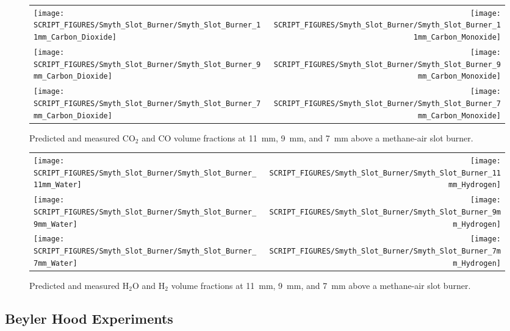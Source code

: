 \begin{figure}[p]
\begin{tabular*}{\textwidth}{l@{\extracolsep{\fill}}r}
\texttt{[image: SCRIPT\_FIGURES/Smyth\_Slot\_Burner/Smyth\_Slot\_Burner\_11mm\_Carbon\_Dioxide]} &
\texttt{[image: SCRIPT\_FIGURES/Smyth\_Slot\_Burner/Smyth\_Slot\_Burner\_11mm\_Carbon\_Monoxide]} \\
\texttt{[image: SCRIPT\_FIGURES/Smyth\_Slot\_Burner/Smyth\_Slot\_Burner\_9mm\_Carbon\_Dioxide]} &
\texttt{[image: SCRIPT\_FIGURES/Smyth\_Slot\_Burner/Smyth\_Slot\_Burner\_9mm\_Carbon\_Monoxide]} \\
\texttt{[image: SCRIPT\_FIGURES/Smyth\_Slot\_Burner/Smyth\_Slot\_Burner\_7mm\_Carbon\_Dioxide]} &
\texttt{[image: SCRIPT\_FIGURES/Smyth\_Slot\_Burner/Smyth\_Slot\_Burner\_7mm\_Carbon\_Monoxide]}
\end{tabular*}
\caption[CO$_2$ and CO volume fractions at 11~mm, 9~mm, and 7~mm above burner, Smyth burner]
{Predicted and measured CO$_2$ and CO volume fractions at 11~mm, 9~mm, and 7~mm above a methane-air slot burner.}
\label{Smyth_Slot_Burner_co_co2}
\end{figure}

\begin{figure}[p]
\begin{tabular*}{\textwidth}{l@{\extracolsep{\fill}}r}
\texttt{[image: SCRIPT\_FIGURES/Smyth\_Slot\_Burner/Smyth\_Slot\_Burner\_11mm\_Water]} &
\texttt{[image: SCRIPT\_FIGURES/Smyth\_Slot\_Burner/Smyth\_Slot\_Burner\_11mm\_Hydrogen]} \\
\texttt{[image: SCRIPT\_FIGURES/Smyth\_Slot\_Burner/Smyth\_Slot\_Burner\_9mm\_Water]} &
\texttt{[image: SCRIPT\_FIGURES/Smyth\_Slot\_Burner/Smyth\_Slot\_Burner\_9mm\_Hydrogen]} \\
\texttt{[image: SCRIPT\_FIGURES/Smyth\_Slot\_Burner/Smyth\_Slot\_Burner\_7mm\_Water]} &
\texttt{[image: SCRIPT\_FIGURES/Smyth\_Slot\_Burner/Smyth\_Slot\_Burner\_7mm\_Hydrogen]}
\end{tabular*}
\caption[H$_2$O and H$_2$ volume fractions at 11~mm, 9~mm, and 7~mm above burner, Smyth burner]
{Predicted and measured H$_2$O and H$_2$ volume fractions at 11~mm, 9~mm, and 7~mm above a methane-air slot burner.}
\label{Smyth_Slot_Burner_h2o_h2}
\end{figure}



\clearpage

\subsection{Beyler Hood Experiments}

